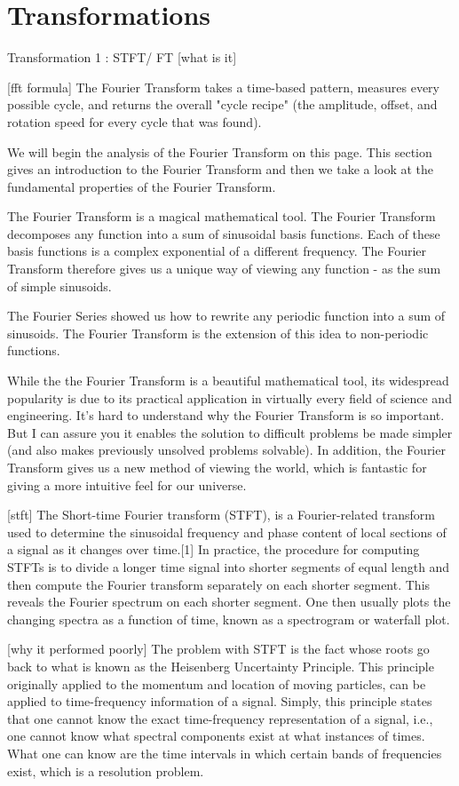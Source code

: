 \documentclass{turabian-thesis}
\begin{document}
\section{Transformations}
Transformation 1 : STFT/ FT
[what is it]

[fft formula]
The Fourier Transform takes a time-based pattern, measures every possible cycle, and returns the overall "cycle recipe" (the amplitude, offset, and rotation speed for every cycle that was found).

We will begin the analysis of the Fourier Transform on this page. This section gives an introduction to the Fourier Transform and then we take a look at the fundamental properties of the Fourier Transform.

The Fourier Transform is a magical mathematical tool. The Fourier Transform decomposes any function into a sum of sinusoidal basis functions. Each of these basis functions is a complex exponential of a different frequency. The Fourier Transform therefore gives us a unique way of viewing any function - as the sum of simple sinusoids.

The Fourier Series showed us how to rewrite any periodic function into a sum of sinusoids. The Fourier Transform is the extension of this idea to non-periodic functions.

While the the Fourier Transform is a beautiful mathematical tool, its widespread popularity is due to its practical application in virtually every field of science and engineering. It's hard to understand why the Fourier Transform is so important. But I can assure you it enables the solution to difficult problems be made simpler (and also makes previously unsolved problems solvable). In addition, the Fourier Transform gives us a new method of viewing the world, which is fantastic for giving a more intuitive feel for our universe.


[stft]
The Short-time Fourier transform (STFT), is a Fourier-related transform used to determine the sinusoidal frequency and phase content of local sections of a signal as it changes over time.[1] In practice, the procedure for computing STFTs is to divide a longer time signal into shorter segments of equal length and then compute the Fourier transform separately on each shorter segment. This reveals the Fourier spectrum on each shorter segment. One then usually plots the changing spectra as a function of time, known as a spectrogram or waterfall plot.




[why it performed poorly]
The problem with STFT is the fact whose roots go back to what is known as the Heisenberg
Uncertainty Principle. This principle originally applied to the momentum and location of
moving particles, can be applied to time-frequency information of a signal. Simply, this principle
states that one cannot know the exact time-frequency representation of a signal, i.e., one cannot
know what spectral components exist at what instances of times. What one can know are the
time intervals in which certain bands of frequencies exist, which is a resolution problem.
\end{document}
